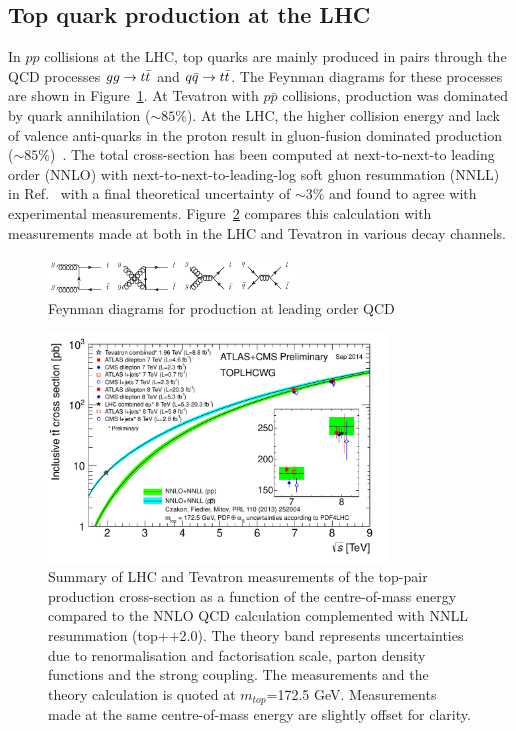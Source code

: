 \subsection{Top quark production at the LHC}

In $pp$ collisions at the LHC, top quarks are mainly produced in pairs through the QCD processes  $gg \rightarrow t\bar{t}$ and $q\bar{q} \rightarrow t\bar{t}$. The Feynman diagrams for these processes are shown in Figure~\ref{fig:ttdiag}. At Tevatron with $p\bar{p}$ collisions, \ttbar production was dominated by quark annihilation ($\sim 85$\%). At the LHC, the higher collision energy and lack of valence anti-quarks in the proton result in gluon-fusion dominated \ttbar production ($\sim 85$\%)~\cite{PDG}. The total \ttbar cross-section has been computed at next-to-next-to leading order (NNLO) with next-to-next-to-leading-log soft gluon resummation (NNLL) in Ref.~\cite{Czakon:2013goa} with a final theoretical uncertainty of $\sim 3 \%$ and found to agree with experimental measurements. Figure~\ref{fig:ttxsec} compares this calculation with measurements made at both in the LHC and Tevatron in various decay channels.

\begin{figure}[h]
\centering
\includegraphics[width=0.6\textwidth]{fig/thry/fig_ttbar.png}
\caption{Feynman diagrams for \ttbar production at leading order QCD}
\label{fig:ttdiag}
\end{figure}

\begin{figure}[h]
\centering
\includegraphics[width=0.8\textwidth]{fig/thry/tt_xsec_vsroots.pdf}
\caption{Summary of LHC and Tevatron measurements of the top-pair production cross-section as a function of the centre-of-mass energy compared to the NNLO QCD calculation complemented with NNLL resummation (top++2.0). The theory band represents uncertainties due to renormalisation and factorisation scale, parton density functions and the strong coupling. The measurements and the theory calculation is quoted at $m_{top}$=172.5 GeV. Measurements made at the same centre-of-mass energy are slightly offset for clarity.}
\label{fig:ttxsec}
\end{figure}

